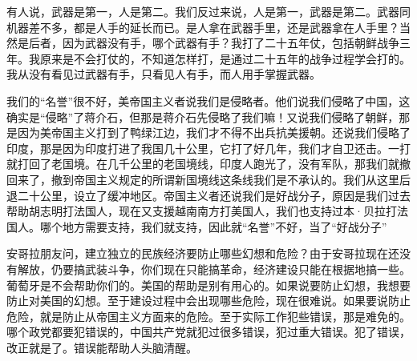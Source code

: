 有人说，武器是第一，人是第二。我们反过来说，人是第一，武器是第二。武器同机器差不多，都是人手的延长而已。是人拿在武器手里，还是武器拿在人手里？当然是后者，因为武器没有手，哪个武器有手？我打了二十五年仗，包括朝鲜战争三年。我原来是不会打仗的，不知道怎样打，是通过二十五年的战争过程学会打的。我从没有看见过武器有手，只看见人有手，而人用手掌握武器。

我们的“名誉”很不好，美帝国主义者说我们是侵略者。他们说我们侵略了中国，这确实是“侵略”了蒋介石，但那是蒋介石先侵略了我们嘛！又说我们侵略了朝鲜，那是因为美帝国主义打到了鸭绿江边，我们才不得不出兵抗美援朝。还说我们侵略了印度，那是因为印度打进了我国几十公里，它打了好几年，我们才自卫还击。一打就打回了老国境。在几千公里的老国境线，印度人跑光了，没有军队，那我们就撤回来了，撤到帝国主义规定的所谓新国境线这条线我们是不承认的。我们从这里后退二十公里，设立了缓冲地区。帝国主义者还说我们是好战分子，原因是我们过去帮助胡志明打法国人，现在又支援越南南方打美国人，我们也支持过本·贝拉打法国人。哪个地方需要支持，我们就支持，因此就“名誉”不好，当了“好战分子”

安哥拉朋友问，建立独立的民族经济要防止哪些幻想和危险？由于安哥拉现在还没有解放，仍要搞武装斗争，你们现在只能搞革命，经济建设只能在根据地搞一些。葡萄牙是不会帮助你们的。美国的帮助是别有用心的。如果说要防止幻想，我想要防止对美国的幻想。至于建设过程中会出现哪些危险，现在很难说。如果要说防止危险，就是防止从帝国主义方面来的危险。至于实际工作犯些错误，那是难免的。哪个政党都要犯错误的，中国共产党就犯过很多错误，犯过重大错误。犯了错误，改正就是了。错误能帮助人头脑清醒。

